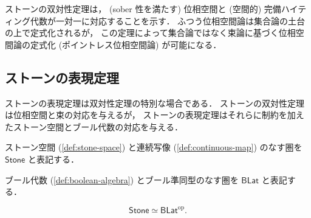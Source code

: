 \documentclass[titlepage]{ltjsreport}
\newcommand{\blat}{\mathsf{BLat}}
\newcommand{\stone}{\mathsf{Stone}}
\begin{document}
ストーンの双対性定理は，
(sober 性を満たす)
位相空間と
(空間的)
完備ハイティング代数が一対一に対応することを示す．
ふつう位相空間論は集合論の土台の上で定式化されるが，
この定理によって集合論ではなく束論に基づく位相空間論の定式化
(ポイントレス位相空間論)
が可能になる．

\subsection{ストーンの表現定理}

ストーンの表現定理は双対性定理の特別な場合である．
ストーンの双対性定理は位相空間と束の対応を与えるが，
ストーンの表現定理はそれらに制約を加えたストーン空間とブール代数の対応を与える．

\begin{definition}[ストーン空間の圏]
  ストーン空間
  (\cref{def:stone-space})
  と連続写像
  (\cref{def:continuous-map})
  のなす圏を $\stone$ と表記する．
\end{definition}

\begin{definition}[ブール代数の圏]
  ブール代数 (\cref{def:boolean-algebra})
  とブール準同型のなす圏を $\blat$ と表記する．
\end{definition}

\newcommand{\spec}{\operatorname{spec}}
\newcommand{\clop}{\operatorname{clop}}

\begin{theorem}[ストーンの表現定理]
  \begin{equation}
    \stone\simeq\blat^\mathrm{op}.
  \end{equation}
\end{theorem}
\end{document}
